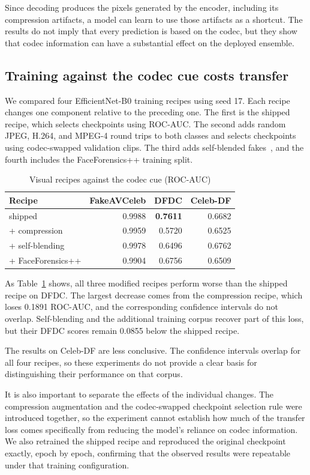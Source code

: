 \documentclass[conference]{IEEEtran}
\begin{document}
Since decoding produces the pixels generated by the encoder, including its
compression artifacts, a model can learn to use those artifacts as a shortcut.
The results do not imply that every prediction is based on the codec, but they
show that codec information can have a substantial effect on the deployed
ensemble.

\subsection{Training against the codec cue costs transfer}

We compared four EfficientNet-B0 training recipes using seed 17. Each recipe
changes one component relative to the preceding one. The first is the shipped
recipe, which selects checkpoints using ROC-AUC. The second adds random JPEG,
H.264, and MPEG-4 round trips to both classes and selects checkpoints using
codec-swapped validation clips. The third adds self-blended fakes~\cite{sbi},
and the fourth includes the FaceForensics++ training split.

\begin{table}[htbp]
\caption{Visual recipes against the codec cue (ROC-AUC)}
\label{tab:recipes}
\centering
\begin{tabular}{lrrr}
\toprule
Recipe & FakeAVCeleb & DFDC & Celeb-DF \\
\midrule
shipped & 0.9988 & \textbf{0.7611} & 0.6682 \\
+ compression & 0.9959 & 0.5720 & 0.6525 \\
+ self-blending & 0.9978 & 0.6496 & 0.6762 \\
+ FaceForensics++ & 0.9904 & 0.6756 & 0.6509 \\
\bottomrule
\end{tabular}
\end{table}

As Table~\ref{tab:recipes} shows, all three modified recipes perform worse
than the shipped recipe on DFDC. The largest decrease comes from the
compression recipe, which loses 0.1891 ROC-AUC, and the corresponding
confidence intervals do not overlap. Self-blending and the additional
training corpus recover part of this loss, but their DFDC scores remain
0.0855 below the shipped recipe.

The results on Celeb-DF are less conclusive. The confidence intervals overlap
for all four recipes, so these experiments do not provide a clear basis for
distinguishing their performance on that corpus.

It is also important to separate the effects of the individual changes. The
compression augmentation and the codec-swapped checkpoint selection rule were
introduced together, so the experiment cannot establish how much of the
transfer loss comes specifically from reducing the model's reliance on codec
information. We also retrained the shipped recipe and reproduced the original
checkpoint exactly, epoch by epoch, confirming that the observed results were
repeatable under that training configuration.
\end{document}
